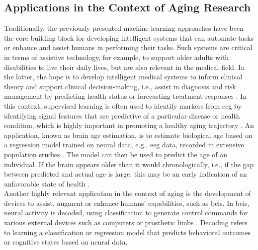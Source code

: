 \subsection{Applications in the Context of Aging Research}
\label{theory:ml:applications_aging}
Traditionally, the previously presented machine learning approaches have been the core building block for developing intelligent systems that can automate tasks or enhance and assist humans in performing their tasks. Such systems are critical in terms of assistive technology, for example, to support older adults with disabilities to live their daily lives, but are also relevant in the medical field. In the latter, the hope is to develop intelligent medical systems to inform clinical theory and support clinical decision-making, i.e., assist in diagnosis and risk management by predicting health status or forecasting treatment responses \cite{Woo2017}. In this context, supervised learning is often used to identify markers from \gls{eeg} by identifying signal features that are predictive of a particular disease or health condition, which is highly important in promoting a healthy aging trajectory \cite{Babiloni2021,Mei2021}. An application, known as brain age estimation, is to estimate biological age based on a regression model trained on neural data, e.g., \gls{eeg} data, recorded in extensive population studies \cite{Engemann2022}. The model can then be used to predict the age of an individual. If the brain appears older than it would chronologically, i.e., if the gap between predicted and actual age is large, this may be an early indication of an unfavorable state of health \cite{Gonneaud2021}.\\
Another highly relevant application in the context of aging is the development of devices to assist, augment or enhance humans' capabilities, such as \glspl{bci}. In \glspl{bci}, neural activity is decoded, using classification to generate control commands for various external devices such as computers or prosthetic limbs \cite{Saha2021, Anumanchipalli2019}. Decoding refers to learning a classification or regression model that predicts behavioral outcomes or cognitive states based on neural data. \\
